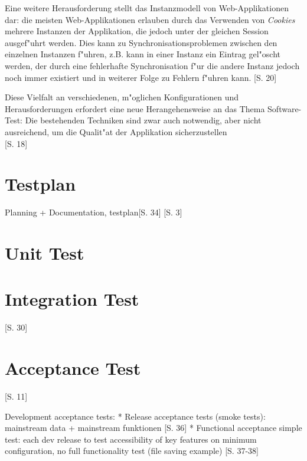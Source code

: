 \documentclass[a4paper,bibtotoc,oneside]{scrbook}
\begin{document}
Eine weitere Herausforderung stellt das Instanzmodell von Web-Applikationen dar: die meisten Web-Applikationen erlauben durch das Verwenden von \emph{Cookies} mehrere Instanzen der Applikation, die jedoch unter der gleichen Session ausgef"uhrt werden. Dies kann zu Synchronisationsproblemen zwischen den einzelnen Instanzen f"uhren, z.B. kann in einer Instanz ein Eintrag gel"oscht werden, der durch eine fehlerhafte Synchronisation f"ur die andere Instanz jedoch noch immer existiert und in weiterer Folge zu Fehlern f"uhren kann. \cite{testing_apps_on_web}[S. 20]

Diese Vielfalt an verschiedenen, m"oglichen Konfigurationen und Herausforderungen erfordert eine neue Herangehensweise an das Thema Software-Test: Die bestehenden Techniken sind \glqq zwar auch notwendig, aber nicht ausreichend, um die Qualit"at der Applikation sicherzustellen\glqq\\ \cite{eval_automat_webapp_test}[S. 18]



\chapter{Testplan}
Planning + Documentation, testplan\cite{testing_apps_on_web}[S. 34]
\cite{test_auto}[S. 3]
\chapter{Unit Test}
\chapter{Integration Test}
\cite{process_oop}[S. 30]
\chapter{Acceptance Test}

\cite{test_auto}[S. 11]

Development acceptance tests:
* Release acceptance tests (smoke tests): mainstream data + mainstream funktionen \cite{testing_apps_on_web}[S. 36]
* Functional acceptance simple test: each dev release to test accessibility of key features on minimum configuration, no full functionality test (file saving example) \cite{testing_apps_on_web}[S. 37-38]
\end{document}
